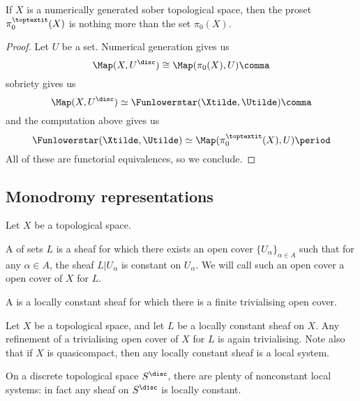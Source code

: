 \begin{thm}
	If $ X $ is a numerically generated sober topological space, then the proset $ \pi_0^{\toptextit}(X) $ is nothing more than the set $ \pi_0(X) $.
\end{thm}

\begin{proof}
	Let $ U $ be a set.
	Numerical generation gives us
	\[
		\Map(X, U^{\disc}) \cong \Map(\pi_0(X), U) \comma
	\]
	sobriety gives us
	\[
		\Map(X, U^{\disc}) \simeq \Funlowerstar(\Xtilde, \Utilde) \comma
	\]
	and the computation above gives us
	\[
		\Funlowerstar(\Xtilde, \Utilde) \simeq \Map(\pi^{\toptextit}_0(X), U) \period
	\]
	All of these are functorial equivalences, so we conclude.
\end{proof}

\subsection{Monodromy representations}%
\label{sub:monodromy_representations}

\begin{dfn}
	Let $ X $ be a topological space.

	A   of sets $ L $ is a sheaf for which there exists an open cover $ \{ U_{\alpha} \}_{\alpha \in A} $ such that for any $ \alpha \in A $, the sheaf $ L | U_{\alpha} $ is constant on $ U_{\alpha} $.
	We will call such an open cover a  open cover of $ X $ for $ L $.

	A  is a locally constant sheaf for which there is a finite trivialising open cover.
\end{dfn}

\begin{nul}
	Let $ X $ be a topological space, and let $ L $ be a locally constant sheaf on $ X $. 
	Any refinement of a trivialising open cover of $ X $ for $ L $ is again trivialising.
	Note also that if $ X $ is quasicompact, then any locally constant sheaf is a local system.
\end{nul}

\begin{exm}
	On a discrete topological space $ S^{\disc} $, there are plenty of nonconstant local systems: in fact any sheaf on $ S^{\disc} $ is locally constant.
\end{exm}


